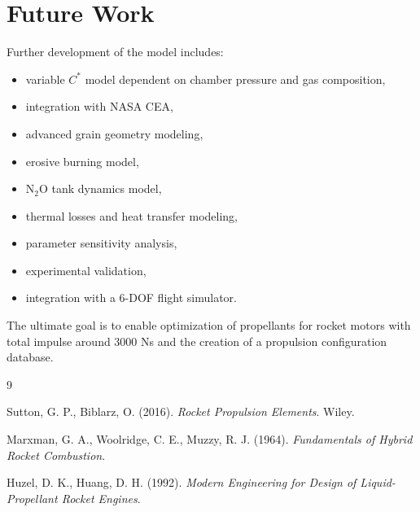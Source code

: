 \documentclass[a4paper,12pt]{article}
\begin{document}
\section{Future Work}

Further development of the model includes:

\begin{itemize}

\item variable $C^*$ model dependent on chamber pressure and gas composition,
\item integration with NASA CEA,
\item advanced grain geometry modeling,
\item erosive burning model,
\item N$_2$O tank dynamics model,
\item thermal losses and heat transfer modeling,
\item parameter sensitivity analysis,
\item experimental validation,
\item integration with a 6-DOF flight simulator.

\end{itemize}

The ultimate goal is to enable optimization of propellants for rocket motors with total impulse around 3000 Ns and the creation of a propulsion configuration database.

\begin{thebibliography}{9}

Sutton, G. P., Biblarz, O. (2016).
\textit{Rocket Propulsion Elements}.
Wiley.

Marxman, G. A., Woolridge, C. E., Muzzy, R. J. (1964).
\textit{Fundamentals of Hybrid Rocket Combustion}.

Huzel, D. K., Huang, D. H. (1992).
\textit{Modern Engineering for Design of Liquid-Propellant Rocket Engines}.

\end{thebibliography}
\end{document}
